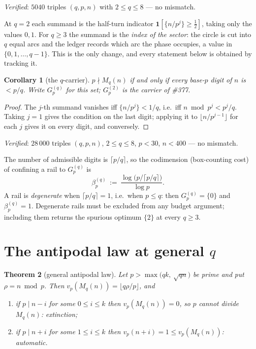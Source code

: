 \documentclass[11pt]{article}
\newtheorem{theorem}{Theorem}
\newtheorem{corollary}[theorem]{Corollary}
\begin{document}
\emph{Verified}: $5040$ triples $(q,p,n)$ with $2\le q\le8$ --- no mismatch.

At $q=2$ each summand is the half-turn indicator $\mathbf 1[\{n/p^{j}\}\ge\frac12]$, taking
only the values $0,1$.  For $q\ge3$ the summand is the \emph{index of the sector}: the circle
is cut into $q$ equal arcs and the ledger records which arc the phase occupies, a value in
$\{0,1,\dots,q-1\}$.  This is the only change, and every statement below is obtained by
tracking it.

\begin{corollary}[the $q$-carrier]\label{cor:carrier}
$p\nmid M_q(n)$ if and only if every base-$p$ digit of $n$ is $<p/q$.  Write
$G_p^{(q)}$ for this set; $G_p^{(2)}$ is the carrier of \textup{\#377}.
\end{corollary}

\begin{proof}
The $j$-th summand vanishes iff $\{n/p^{j}\}<1/q$, i.e.\ iff $n\bmod p^{j}<p^{j}/q$.  Taking
$j=1$ gives the condition on the last digit; applying it to $\lfloor n/p^{j-1}\rfloor$ for
each $j$ gives it on every digit, and conversely.
\end{proof}

\emph{Verified}: $28\,000$ triples $(q,p,n)$, $2\le q\le8$, $p<30$, $n<400$ --- no mismatch.

The number of admissible digits is $\lceil p/q\rceil$, so the codimension (box-counting cost)
of confining a rail to $G_p^{(q)}$ is
\[
  \beta_p^{(q)}\ :=\ \frac{\log\bigl(p/\lceil p/q\rceil\bigr)}{\log p} .
\]
A rail is \emph{degenerate} when $\lceil p/q\rceil=1$, i.e.\ when $p\le q$: then
$G_p^{(q)}=\{0\}$ and $\beta_p^{(q)}=1$.  Degenerate rails must be excluded from any budget
argument; including them returns the spurious optimum $\{2\}$ at every $q\ge3$.

\section{The antipodal law at general $q$}

\begin{theorem}[general antipodal law]\label{thm:anti}
Let $p>\max\bigl(qk,\ \sqrt{qn}\bigr)$ be prime and put $\rho=n\bmod p$.  Then
$v_p(M_q(n))=\lfloor q\rho/p\rfloor$, and
\begin{enumerate}
\item[(a)] if $p\mid n-i$ for some $0\le i\le k$ then $v_p(M_q(n))=0$, so $p$ cannot divide
      $M_q(n)$: \emph{extinction};
\item[(b)] if $p\mid n+i$ for some $1\le i\le k$ then $v_p(n+i)=1\le v_p(M_q(n))$:
      \emph{automatic}.
\end{enumerate}
\end{theorem}
\end{document}
